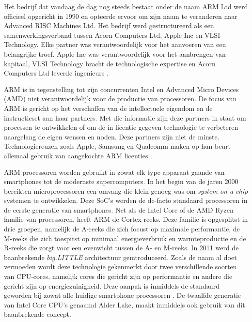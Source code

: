 Het bedrijf dat vandaag de dag nog steeds bestaat onder de naam ARM Ltd werd officieel opgericht in 1990 en opteerde ervoor om zijn naam te veranderen naar Advanced RISC Machines Ltd. Het bedrijf werd gestructureerd als een samenwerkingsverband tussen Acorn Computers Ltd, Apple Inc en VLSI Technology. Elke partner was verantwoordelijk voor het aanvoeren van een belangrijke troef. Apple Inc was verantwoordelijk voor het aanbrengen van kapitaal, VLSI Technology bracht de technologische expertise en Acorn Computers Ltd leverde ingenieurs \autocite{Walshe2015}.

ARM is in tegenstelling tot zijn concurrenten Intel en Advanced Micro Devices (AMD) niet verantwoordelijk voor de productie van processoren. De focus van ARM is gericht op het verschaffen van de intellectuele eigendom en de instructieset aan haar partners. Met die informatie zijn deze partners in staat om processen te ontwikkelen of om de in licentie gegeven technologie te verbeteren naargelang de eigen wensen en noden. Deze partners zijn niet de minste. Technologiereuzen zoals Apple, Samsung en Qualcomm maken op hun beurt allemaal gebruik van aangekochte ARM licenties \autocite{Ahammed2017}.

ARM processoren worden gebruikt in zowat elk type apparaat gaande van smartphones tot de modernste supercomputers. In het begin van de jaren 2000 bereikten microprocessoren een omvang die klein genoeg was om \textit{system-on-a-chip} systemen te ontwikkelen. Deze SoC’s werden de de-facto standaard processoren in de eerste generatie van smartphones. Net als de Intel Core of de AMD Ryzen familie van processoren, heeft ARM de Cortex reeks. Deze familie is opgesplitst in drie groepen, namelijk de A-reeks die zich focust op maximale performantie, de M-reeks die zich toespitst op minimaal energieverbruik en warmteproductie en de R-reeks die zorgt voor een evenwicht tussen de A- en M-reeks. In 2011 werd de baanbrekende \textit{big.LITTLE} architectuur geïntroduceerd. Zoals de naam al doet vermoeden wordt deze technologie gekenmerkt door twee verschillende soorten van CPU-cores, namelijk cores die gericht zijn op performantie en andere die gericht zijn op energiezuinigheid. Deze aanpak is inmiddels de standaard geworden bij zowat alle huidige smartphone processoren \autocite{Walshe2015a}. De twaalfde generatie van Intel Core CPU’s genaamd Alder Lake, maakt inmiddels ook gebruik van dit baanbrekende concept.

